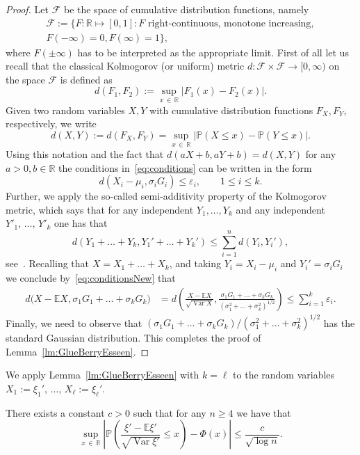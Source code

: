 \documentclass[10pt]{amsart}
\theoremstyle{definition}\newtheorem{defi}[theo]{Definition}\newtheorem{rema}[theo]{Remark}\newtheorem{exam}[theo]{Example}\newtheorem{exem}[theo]{Example}\newtheorem{nota}[theo]{Notation}
\newcommand{\var}{\operatorname{Var}}
\newcommand{\bbR}{\mathbb{R}}
\newcommand{\bbE}{\mathbb{E}}
\newcommand{\bbP}{\mathbb{P}}
\newcommand{\clF}{\mathcal{F}}
\begin{document}
\begin{proof}
Let $\clF$ be the space of cumulative distribution functions, namely
\begin{multline*}
\clF:=\big\{F:\bbR\mapsto[0,1]\colon F \text{ right-continuous, monotone increasing},
\\ F(-\infty)=0, F(\infty)=1\big\},
\end{multline*}
where $F(\pm\infty)$ has to be interpreted as the appropriate limit. First of all let us recall that the classical Kolmogorov (or uniform) metric $d:\clF\times\clF\to [0,\infty)$ on the space $\clF$ is defined as
\[
d(F_1,F_2):=\sup_{x\,\in\,\bbR}|F_1(x)-F_2(x)|.
\]
Given two random variables $X,Y$ with cumulative distribution functions $F_X,F_Y$, respectively, we write
\[
d(X,Y):=d(F_X,F_Y)=\sup_{x\,\in\,\bbR}\left|\bbP(X\leq x)-\bbP(Y\leq x)\right|.
\]
Using this notation and the fact that $d(aX+b,aY+b)=d(X,Y)$ for any $a>0,b\in\bbR$ the conditions in~\eqref{eq:conditions} can be written in the form
\begin{equation}\label{eq:conditionsNew}
d(X_i-\mu_i,\sigma_i G_i)\leq \varepsilon_i,\qquad 1\leq i\leq k.
\end{equation}
Further, we apply the so-called semi-additivity property of the Kolmogorov metric, which says that for any independent $Y_1,\ldots,Y_k$ and any independent $Y'_1,\,\ldots,\,Y'_k$ one has that
\[
d(Y_1+\ldots+Y_k,Y_1'+\ldots+Y_k')\leq \sum_{i=1}^n d(Y_i,Y_i'),
\]
see~\cite[Section~2.3, Equation~(1.2)]{Zol76}. Recalling that $X=X_1+\ldots+X_k$, and taking $Y_i=X_i-\mu_i$ and $Y_i'=\sigma_i G_i$ we conclude by~\eqref{eq:conditionsNew} that
\begin{align*}
d\big(X-\bbE X, \sigma_1 G_1+\ldots+\sigma_k G_k\big)&=d\left(\frac{X-\bbE X}{\sqrt{\var X}}, \frac{\sigma_1 G_1+\ldots+\sigma_k G_k}{(\sigma_1^2+\ldots+\sigma_k^2)^{1/2}}\right)\leq \sum_{i=1}^k\varepsilon_i.
\end{align*}
Finally, we need to observe that $(\sigma_1 G_1+\ldots+\sigma_k G_k)/(\sigma_1^2+\ldots+\sigma_k^2)^{1/2}$ has the standard Gaussian distribution. This completes the proof of Lemma~\ref{lm:GlueBerryEsseen}.
\end{proof}

We apply Lemma~\ref{lm:GlueBerryEsseen} with $k=\ell$ to the random variables $X_1:=\xi_1',\,\ldots,\,X_\ell:=\xi_\ell'$.

\begin{coro}\label{cor:PoissonWithZ}
There exists a constant $c>0$ such that for any $n\geq 4$ we have that
\[
\sup_{x\,\in\,\bbR}\left|\bbP\left(\frac{\xi'-\bbE\xi'}{\sqrt{\var \xi'}}\leq x\right)-\Phi(x)\right|\leq \frac{c}{\sqrt{\log n}}.
\]
\end{coro}
\end{document}
